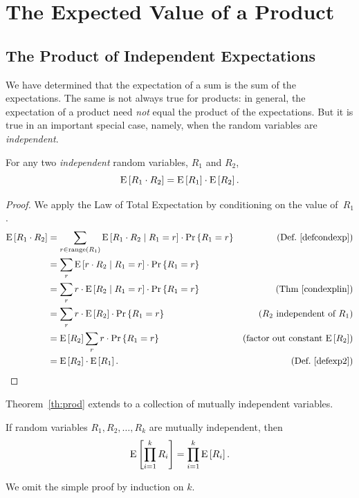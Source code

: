 \documentclass[11pt,twoside]{article}
\begin{document}
\section{The Expected Value of a Product}

\subsection{The Product of Independent Expectations}

We have determined that the expectation of a sum is the sum of the
expectations.  The same is not always true for products: in general, the
expectation of a product need \emph{not} equal the product of the
expectations.  But it is true in an important special case, namely, when
the random variables are \emph{independent}.

\begin{theorem}\label{th:prod}
For any two \emph{independent} random variables, $R_1$ and $R_2$,
\[
\mathop{\textup{E}}\nolimits\left[R_1 \cdot R_2\right] = \mathop{\textup{E}}\nolimits\left[R_1\right] \cdot \mathop{\textup{E}}\nolimits\left[R_2\right].
\]
\end{theorem}

\begin{proof}
We apply the Law of Total Expectation by conditioning on the value
of~$R_1$.
\begin{align*}
\mathop{\textup{E}}\nolimits\left[R_1 \cdot R_2\right] & = \sum_{r \in \mathop{\textup{range}}\nolimits\left(R_1\right)} \mathop{\textup{E}}\nolimits\left[R_1 \cdot
           R_2\mid R_1 = r\right] \cdot \mathop{\textup{Pr}}\nolimits\left\{R_1 = r\right\} & \text{(Def.~\ref{defcondexp})}\\
   & = \sum_{r} \mathop{\textup{E}}\nolimits\left[r \cdot
           R_2\mid R_1 = r\right] \cdot \mathop{\textup{Pr}}\nolimits\left\{R_1 = r\right\}\\
   & = \sum_{r} r \cdot \mathop{\textup{E}}\nolimits\left[R_2\mid R_1 = r\right] \cdot \mathop{\textup{Pr}}\nolimits\left\{R_1 = r\right\}
                 & \text{(Thm~\ref{condexplin})}\\
   & = \sum_{r} r \cdot \mathop{\textup{E}}\nolimits\left[R_2\right] \cdot \mathop{\textup{Pr}}\nolimits\left\{R_1 = r\right\}
                     & \text{($R_2$ independent of $R_1$)}\\
   & = \mathop{\textup{E}}\nolimits\left[R_2\right] \sum_{r} r \cdot \mathop{\textup{Pr}}\nolimits\left\{R_1 = r\right\}
              & \text{(factor out constant $\mathop{\textup{E}}\nolimits\left[R_2\right]$)}\\
  & = \mathop{\textup{E}}\nolimits\left[R_2\right] \cdot \mathop{\textup{E}}\nolimits\left[R_1\right]. & \text{(Def.~\ref{defexp2})}
\end{align*}
\end{proof}

Theorem~\ref{th:prod} extends to a collection of mutually independent
variables.
\begin{corollary}
If random variables $R_1, R_2, \dots, R_k$ are mutually
independent, then
\[
\mathop{\textup{E}}\nolimits\left[\prod_{i=1}^k R_i\right] = \prod_{i=1}^k \mathop{\textup{E}}\nolimits\left[R_i\right].
\]
\end{corollary}
We omit the simple proof by induction on $k$.
\end{document}
